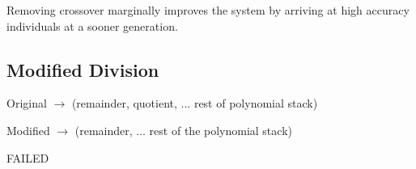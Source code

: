 \documentclass[20pt]{extarticle}
\begin{document}
Removing crossover marginally improves the system by arriving at high accuracy individuals at a sooner generation.

\subsection*{Modified Division}

\noindent Original $\rightarrow$ (remainder, quotient, ... rest of polynomial stack)

\noindent Modified $\rightarrow$ (remainder, ... rest of the polynomial stack)

\noindent FAILED
\end{document}
